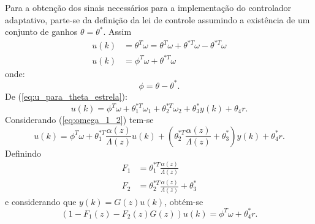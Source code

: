     Para a obtenção dos sinais necessários para a implementação do controlador adaptativo,
    parte-se da definição da lei de controle assumindo a existência de um conjunto de ganhos
    $\theta = \theta^*$. Assim
    \begin{equation}
        \begin{split}
            u(k) &= \theta^T \omega = \theta^T \omega + \theta^{*T} \omega - \theta^{*T} \omega\\
            u(k) &= \phi^T \omega + \theta^{*T} \omega
            \label{eq:u_para_theta_estrela}
        \end{split}
    \end{equation}
    onde:
    \begin{equation*}
        \phi = \theta - \theta^* \text{.}
    \end{equation*}
    De (\ref{eq:u_para_theta_estrela}):
    \begin{equation*}
        u(k) = \phi^T \omega + \theta_1^{*T} \omega_1 + \theta_2^{*T} \omega_2 + \theta_3^* y(k)
            + \theta_4 r \text{.}
    \end{equation*}
    Considerando (\ref{eq:omega_1_2}) tem-se
    \begin{equation*}
        u(k) = \phi^T \omega + \theta_1^{*T} \frac{\alpha(z)}{\Lambda(z)} u(k) +
            \left( \theta_2^{*T} \frac{\alpha(z)}{\Lambda(z)} + \theta_3^* \right)
            y(k) + \theta_4^* r \text{.}
    \end{equation*}
    Definindo
    \begin{equation*}
        \begin{split}
            F_1 &= \theta_1^{*T} \frac{\alpha(z)}{\Lambda(z)}\\
            F_2 &= \theta_2^{*T} \frac{\alpha(z)}{\Lambda(z)} + \theta_3^*
        \end{split}
    \end{equation*}
    e considerando que $y(k) = G(z) u(k)$, obtém-se
    \begin{equation}
        \left( 1 - F_1(z) - F_2(z) G(z) \right) u(k) = \phi^T \omega + \theta_4^* r \text{.}
        \label{eq:funcao_de_fs}
    \end{equation}

